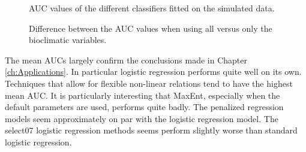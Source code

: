 \begin{figure}[!htb]
\center
{}
\caption{\label{fig:AUCSimulation}AUC values of the different classifiers fitted on the simulated data.}
\end{figure}


\begin{figure}[!htb]
\center
{}
\caption{\label{fig:DiffSimulation}Difference between the AUC values when using all versus only the bioclimatic variables.}
\end{figure}

The mean AUCs largely confirm the conclusions made in Chapter \ref{ch:Applications}. In particular logistic regression performs quite well on its own. Techniques that allow for flexible non-linear relations tend to have the highest mean AUC. It is particularly interesting that MaxEnt, especially when the default parameters are used, performs quite badly. The penalized regression models seem approximately on par with the logistic regression model. The select07 logistic regression methods seems perform slightly worse than standard logistic regression. \\ 

